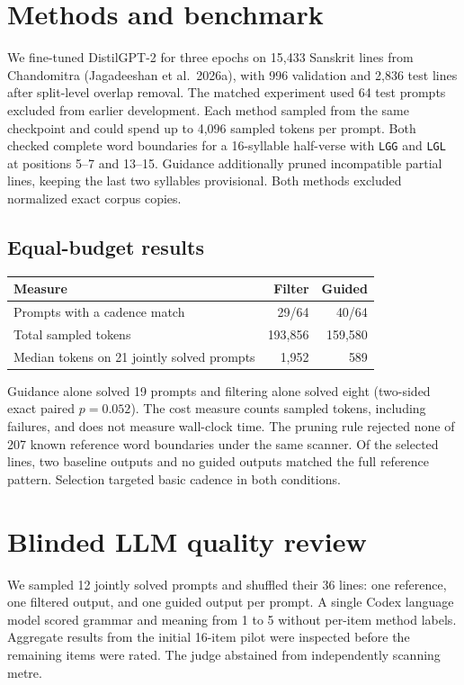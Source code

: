 \documentclass[11pt]{article}
\begin{document}
\section{Methods and benchmark}
We fine-tuned DistilGPT-2 for three epochs on 15,433 Sanskrit lines from Chandomitra (Jagadeeshan et al.\ 2026a), with 996 validation and 2,836 test lines after split-level overlap removal. The matched experiment used 64 test prompts excluded from earlier development. Each method sampled from the same checkpoint and could spend up to 4,096 sampled tokens per prompt. Both checked complete word boundaries for a 16-syllable half-verse with \texttt{LGG} and \texttt{LGL} at positions 5--7 and 13--15. Guidance additionally pruned incompatible partial lines, keeping the last two syllables provisional. Both methods excluded normalized exact corpus copies.

\subsection{Equal-budget results}
\begin{center}
\small
\begin{tabularx}{\linewidth}{@{}Xrr@{}}
\toprule
Measure & Filter & Guided\\
\midrule
Prompts with a cadence match & 29/64 & 40/64\\
Total sampled tokens & 193,856 & 159,580\\
Median tokens on 21 jointly solved prompts & 1,952 & 589\\
\bottomrule
\end{tabularx}
\end{center}
Guidance alone solved 19 prompts and filtering alone solved eight (two-sided exact paired \(p=0.052\)). The cost measure counts sampled tokens, including failures, and does not measure wall-clock time. The pruning rule rejected none of 207 known reference word boundaries under the same scanner. Of the selected lines, two baseline outputs and no guided outputs matched the full reference pattern. Selection targeted basic cadence in both conditions.

\section{Blinded LLM quality review}
We sampled 12 jointly solved prompts and shuffled their 36 lines: one reference, one filtered output, and one guided output per prompt. A single Codex language model scored grammar and meaning from 1 to 5 without per-item method labels. Aggregate results from the initial 16-item pilot were inspected before the remaining items were rated. The judge abstained from independently scanning metre.
\end{document}
